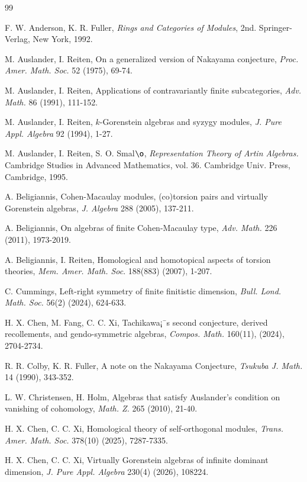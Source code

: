 \documentclass[11pt,a4paper]{article}
\begin{document}
\begin{thebibliography}{99}

 F. W. Anderson,  K. R. Fuller,  {\it Rings and
Categories  of  Modules}, 2nd. Springer-Verlag, New York, 1992.

  M. Auslander, I. Reiten, On a generalized version of Nakayama conjecture, {\it Proc. Amer. Math. Soc.}  52 (1975), 69-74.

  M. Auslander, I. Reiten, Applications of contravariantly finite subcategories, {\it Adv. Math.} 86 (1991), 111-152.

  M. Auslander, I. Reiten,  $k$-Gorenstein algebras and syzygy modules, {\it J. Pure Appl.
Algebra} 92 (1994), 1-27.

 M. Auslander, I. Reiten, S. O. Smal${\o}$, {\it Representation Theory of Artin Algebras.} Cambridge Studies in Advanced Mathematics, vol. 36. Cambridge Univ.  Press, Cambridge, 1995.

 A. Beligiannis, Cohen-Macaulay modules, (co)torsion pairs and virtually Gorenstein algebras, {\it J. Algebra }  288 (2005), 137-211.

 A. Beligiannis, On algebras of finite Cohen-Macaulay type,  {\it Adv. Math. }  226 (2011), 1973-2019.

 A. Beligiannis, I. Reiten,  Homological and homotopical aspects of torsion theories, {\it Mem. Amer. Math. Soc}. 188(883) (2007), 1-207.

 C. Cummings, Left-right symmetry of finite finitistic dimension, {\it Bull. Lond. Math. Soc.} 56(2) (2024),  624-633.


 H. X. Chen, M. Fang, C. C. Xi, Tachikawa¡¯s second conjecture, derived recollements, and gendo-symmetric algebras, {\it Compos. Math.} 160(11),  (2024), 2704-2734.

 R. R. Colby, K. R. Fuller,  A note on the Nakayama Conjecture, {\it Tsukuba J. Math.}
14 (1990), 343-352.

 L. W. Christensen, H. Holm,  Algebras that satisfy Auslander's condition on vanishing
of cohomology, {\it Math. Z.} 265 (2010),  21-40.


 H. X. Chen, C. C. Xi,  Homological theory of self-orthogonal modules,  {\it Trans. Amer. Math. Soc.} 378(10) (2025),  7287-7335.

 H. X. Chen,   C. C. Xi,  Virtually Gorenstein algebras of infinite dominant dimension, {\it J. Pure Appl.
Algebra} 230(4) (2026), 108224.


\end{thebibliography}
\end{document}
